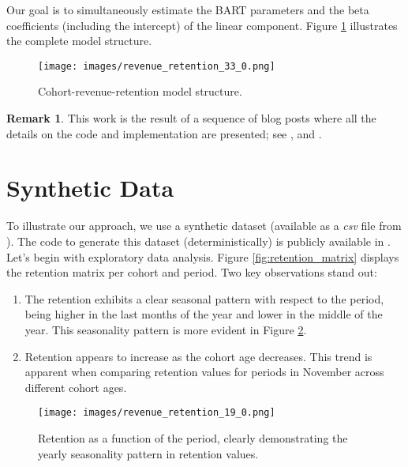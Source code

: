 \documentclass[11pt]{amsart}
\theoremstyle{definition}
\newtheorem{remark}{Remark}
\begin{document}
Our goal is to simultaneously estimate the BART parameters and the beta coefficients (including the intercept) of the linear
component. Figure \ref{fig:revenue_retention_model} illustrates the complete model structure.

\begin{figure}
    \centering
    \texttt{[image: images/revenue\_retention\_33\_0.png]}
    \caption{Cohort-revenue-retention model structure.}
    \label{fig:revenue_retention_model}
\end{figure}


\begin{remark}
    This work is the result of a sequence of blog posts where all the details on the code and implementation are presented;
    see \cite{orduz_retention}, \cite{orduz_retention_bart} and \cite{orduz_revenue_retention}.
\end{remark}


\section{Synthetic Data}

To illustrate our approach, we use a synthetic dataset (available as a {\em csv} file from \cite{orduz_revenue_retention}).
The code to generate this dataset (deterministically) is publicly available in \cite{orduz_revenue_retention_data_code}. \\

Let's begin with exploratory data analysis. Figure \ref{fig:retention_matrix} displays the retention matrix per cohort and
period. Two key observations stand out:

\begin{enumerate}
    \item The retention exhibits a clear seasonal pattern with respect to the period, being higher in the last months of the
          year and lower in the middle of the year. This seasonality pattern is more evident in Figure
          \ref{fig:retention_seasonal}.
    \item Retention appears to increase as the cohort age decreases. This trend is apparent when comparing retention values
          for periods in November across different cohort ages.
\end{enumerate}

\begin{figure}
    \centering
    \texttt{[image: images/revenue\_retention\_19\_0.png]}
    \caption{Retention as a function of the period, clearly demonstrating the yearly seasonality pattern in retention values.}
    \label{fig:retention_seasonal}
\end{figure}
\end{document}
